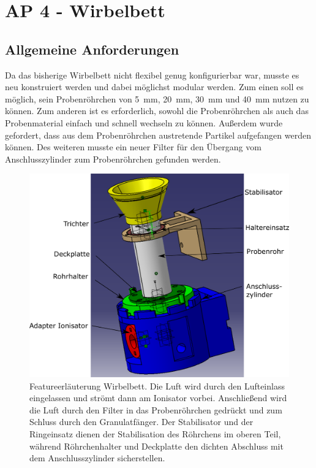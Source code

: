 \newpage


\section{AP 4 - Wirbelbett}


\subsection{Allgemeine Anforderungen}

Da das bisherige Wirbelbett nicht flexibel genug konfigurierbar war, musste es neu konstruiert werden und dabei möglichst modular werden. Zum einen soll es möglich, sein Probenröhrchen von \SI{5}{mm}, \SI{20}{mm}, \SI{30}{mm} und \SI{40}{mm} nutzen zu können. Zum anderen ist es erforderlich, sowohl die Probenröhrchen als auch das Probenmaterial einfach und schnell wechseln zu können. Außerdem wurde gefordert, dass aus dem Probenröhrchen austretende Partikel aufgefangen werden können. Des weiteren musste ein neuer Filter für den Übergang vom Anschlusszylinder zum Probenröhrchen gefunden werden. 


\begin{figure}[h!]
	\begin{center}
		\includegraphics[scale=0.4]{Zusammenbau_fluides_Bett.png}
		\caption[Modell Wirbelbett]{Featureerläuterung Wirbelbett. Die Luft wird durch den Lufteinlass eingelassen und strömt dann am Ionisator vorbei. Anschließend wird die Luft durch den Filter in das Probenröhrchen gedrückt und zum Schluss durch den Granulatfänger. Der Stabilisator und der Ringeinsatz dienen der Stabilisation des Röhrchens im oberen Teil, während Röhrchenhalter und Deckplatte den dichten Abschluss mit dem Anschlusszylinder sicherstellen.}
	\end{center}
\end{figure}


